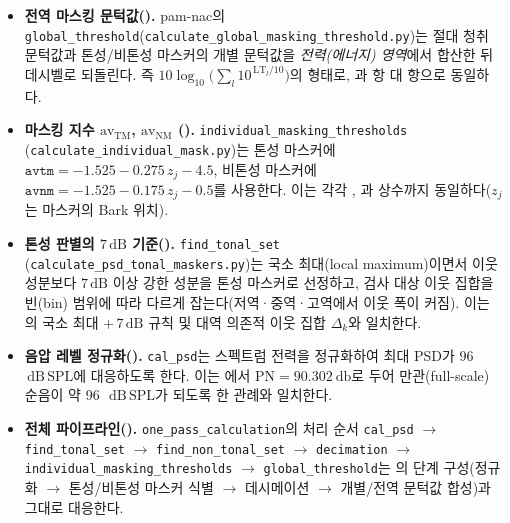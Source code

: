 \documentclass[11pt,a4paper]{article}
\newcommand{\dB}{\ensuremath{\,\mathrm{dB}}}          %
\newcommand{\dBSPL}{\ensuremath{\,\mathrm{dB\,SPL}}}  %
\begin{document}
\begin{itemize}
  \item \textbf{전역 마스킹 문턱값().} pam-nac의
        \texttt{global\_threshold}(\texttt{calculate\_global\_masking\_threshold.py})는
        절대 청취 문턱값과 톤성/비톤성 마스커의 개별 문턱값을 \emph{전력(에너지)
        영역}에서 합산한 뒤 데시벨로 되돌린다. 즉 $10\log_{10}\!\bigl(\sum_l
        10^{\,\mathrm{LT}_l/10}\bigr)$의 형태로, 과 항 대 항으로
        동일하다.
  \item \textbf{마스킹 지수 $\mathrm{av}_{\mathrm{TM}}$, $\mathrm{av}_{\mathrm{NM}}$
        ().} \texttt{individual\_masking\_thresholds}
        (\texttt{calculate\_individual\_mask.py})는 톤성 마스커에
        $\texttt{avtm} = -1.525 - 0.275\,z_j - 4.5$, 비톤성 마스커에
        $\texttt{avnm} = -1.525 - 0.175\,z_j - 0.5$를 사용한다. 이는 각각
        , 과 상수까지 동일하다($z_j$는 마스커의 Bark
        위치).
  \item \textbf{톤성 판별의 $7\dB$ 기준().} \texttt{find\_tonal\_set}
        (\texttt{calculate\_psd\_tonal\_maskers.py})는 국소 최대(local maximum)이면서
        이웃 성분보다 $7\dB$ 이상 강한 성분을 톤성 마스커로 선정하고, 검사 대상
        이웃 집합을 빈(bin) 범위에 따라 다르게 잡는다(저역·중역·고역에서 이웃 폭이
        커짐). 이는 의 국소 최대 $+\,7\dB$ 규칙 및 대역 의존적 이웃
        집합 $\Delta_k$와 일치한다.
  \item \textbf{음압 레벨 정규화().} \texttt{cal\_psd}는 스펙트럼
        전력을 정규화하여 최대 PSD가 \SI{96}{\dBSPL}에 대응하도록 한다. 이는
        에서 $\mathrm{PN}=\SI{90.302}{\decibel}$로 두어 만관(full-scale)
        순음이 약 \SI{96}{\dBSPL}가 되도록 한 관례와 일치한다.
  \item \textbf{전체 파이프라인().} \texttt{one\_pass\_calculation}의
        처리 순서 \texttt{cal\_psd} $\to$ \texttt{find\_tonal\_set} $\to$
        \texttt{find\_non\_tonal\_set} $\to$ \texttt{decimation} $\to$
        \texttt{individual\_masking\_thresholds} $\to$ \texttt{global\_threshold}는
        의 단계 구성(정규화 $\to$ 톤성/비톤성 마스커 식별 $\to$
        데시메이션 $\to$ 개별/전역 문턱값 합성)과 그대로 대응한다.
\end{itemize}
\end{document}
